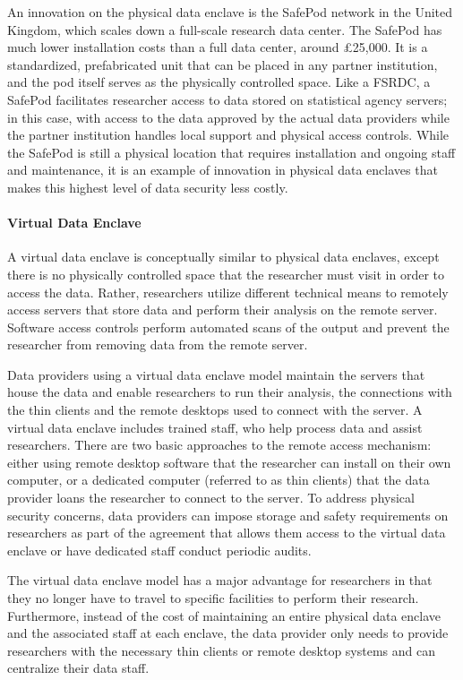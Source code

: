 An innovation on the physical data enclave is the SafePod network in the
United Kingdom, which scales down a full-scale research data center. The
SafePod has much lower installation costs than a full data center,
around £25,000. It is a standardized, prefabricated unit that can be
placed in any partner institution, and the pod itself serves as the
physically controlled space. Like a FSRDC, a SafePod facilitates
researcher access to data stored on statistical agency servers; in this
case, with access to the data approved by the actual data providers
while the partner institution handles local support and physical access
controls. While the SafePod is still a physical location that requires
installation and ongoing staff and maintenance, it is an example of
innovation in physical data enclaves that makes this highest level of
data security less costly.

\hypertarget{virtual-data-enclave}{%
\paragraph{Virtual Data Enclave}\label{virtual-data-enclave}}

A virtual data enclave is conceptually similar to physical data
enclaves, except there is no physically controlled space that the
researcher must visit in order to access the data. Rather, researchers
utilize different technical means to remotely access servers that store
data and perform their analysis on the remote server. Software access
controls perform automated scans of the output and prevent the
researcher from removing data from the remote server.

Data providers using a virtual data enclave model maintain the servers
that house the data and enable researchers to run their analysis, the
connections with the thin clients and the remote desktops used to
connect with the server. A virtual data enclave includes trained staff,
who help process data and assist researchers. There are two basic
approaches to the remote access mechanism: either using remote desktop
software that the researcher can install on their own computer, or a
dedicated computer (referred to as thin clients) that the data provider
loans the researcher to connect to the server. To address physical
security concerns, data providers can impose storage and safety
requirements on researchers as part of the agreement that allows them
access to the virtual data enclave or have dedicated staff conduct
periodic audits.

The virtual data enclave model has a major advantage for researchers in
that they no longer have to travel to specific facilities to perform
their research. Furthermore, instead of the cost of maintaining an
entire physical data enclave and the associated staff at each enclave,
the data provider only needs to provide researchers with the necessary
thin clients or remote desktop systems and can centralize their data
staff.

